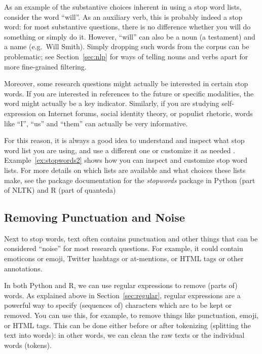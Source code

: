 As an example of the substantive choices inherent in using a stop word lists,
consider the word ``will''.
As an auxiliary verb, this is probably indeed a stop word: for most substantive questions, there is no difference
whether you will do something or simply do it.
However, ``will'' can also be a noun (a testament) and a name (e.g.\ Will Smith).
Simply dropping such words from the corpus can be problematic; see Section~\ref{sec:nlp} for ways of telling nouns and verbs apart
for more fine-grained filtering.

Moreover, some research questions might actually be interested in certain stop words.
If you are interested in references to the future or specific modalities,
the word might actually be a key indicator.
Similarly, if you are studying self-expression on Internet forums, social identity theory, or populist rhetoric,
words like ``I'', ``us'' and ``them'' can actually be very informative.

For this reason, it is always a good idea to understand and inspect what stop word list you are using,
and use a different one or customize it as needed \citep[see also][]{nothman18}.
Example~\ref{ex:stopwords2} shows how you can inspect and customize stop word lists.
For more details on which lists are available and what choices these lists make,
see the package documentation for the \emph{stopwords} package in Python (part of NLTK) and R (part of quanteda)




\subsection{Removing Punctuation and Noise}\label{sec:punctuation}


Next to stop words, text often contains punctuation and other things that can be considered ``noise'' for most research questions.
For example, it could contain emoticons or emoji, Twitter hashtags or at-mentions, or HTML tags or other annotations.

In both Python and R, we can use regular expressions to remove (parts of) words.
As explained above in Section~\ref{sec:regular}, regular expressions are a powerful way to specify (sequences of) characters which are to be kept or removed.
You can use this, for example, to remove things like punctuation, emoji, or HTML tags.
This can be done either before or after tokenizing (splitting the text into words):
in other words, we can clean the raw texts or the individual words (tokens).

